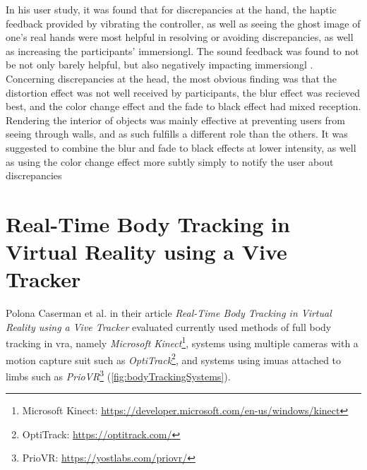 In his user study, it was found that for discrepancies at the hand, the haptic feedback provided by vibrating the controller, as well as seeing the ghost image of one's real hands were most helpful in resolving or avoiding discrepancies, as well as increasing the participants' \gls{immersiongl}. The sound feedback was found to not be not only barely helpful, but also negatively impacting \gls{immersiongl} \autocite[p. ~29-34]{JohnnyVEThesis}.
\newline
Concerning discrepancies at the head, the most obvious finding was that the distortion effect was not well received by participants, the blur effect was recieved best, and the color change effect and the fade to black effect had mixed reception. Rendering the interior of objects was mainly effective at preventing users from seeing through walls, and as such fulfills a different role than the others. It was suggested to combine the blur and fade to black effects at lower intensity, as well as using the color change effect more subtly simply to notify the user about discrepancies  \autocite[p. ~35-39]{JohnnyVEThesis}

\section{Real-Time Body Tracking in Virtual Reality using a Vive Tracker}

Polona Caserman et al. in their article \textit{Real-Time Body Tracking in Virtual Reality using a Vive Tracker} \autocite{bodyTrackingVR} evaluated currently used methods of full body tracking in \gls{vra}, namely \textit{Microsoft Kinect}\footnote{Microsoft Kinect: \url{https://developer.microsoft.com/en-us/windows/kinect}}, systems using multiple cameras with a motion capture suit such as \textit{OptiTrack}\footnote{OptiTrack: \url{https://optitrack.com/}}, and systems using \glspl{imua} attached to limbs such as \textit{PrioVR}\footnote{PrioVR: \url{https://yostlabs.com/priovr/}} (\autoref{fig:bodyTrackingSystems}).

